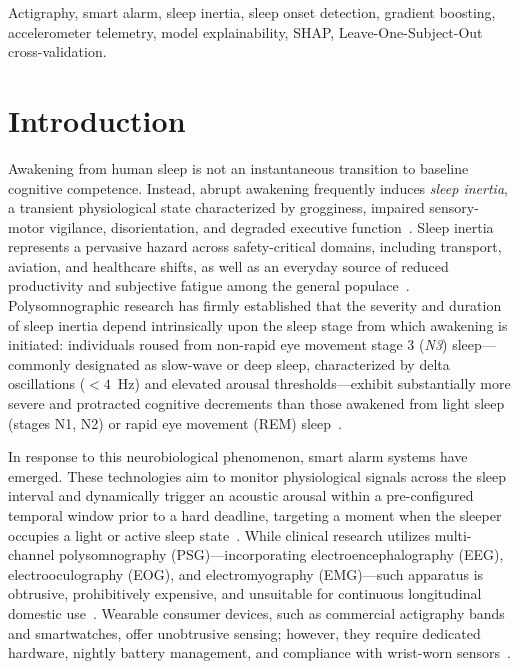 \documentclass[journal,11pt,onecolumn]{IEEEtran}
\begin{document}
\begin{IEEEkeywords}
Actigraphy, smart alarm, sleep inertia, sleep onset detection, gradient boosting, accelerometer telemetry, model explainability, SHAP, Leave-One-Subject-Out cross-validation.
\end{IEEEkeywords}

\section{Introduction}
\label{sec:introduction}\hypertarget{sec:introduction}{}

Awakening from human sleep is not an instantaneous transition to baseline cognitive competence. Instead, abrupt awakening frequently induces \textit{sleep inertia}, a transient physiological state characterized by grogginess, impaired sensory-motor vigilance, disorientation, and degraded executive function~\cite{tassi2000sleep, wertz2006effects}. Sleep inertia represents a pervasive hazard across safety-critical domains, including transport, aviation, and healthcare shifts, as well as an everyday source of reduced productivity and subjective fatigue among the general populace~\cite{ferrara2000sleep, hilditch2019sleep}. Polysomnographic research has firmly established that the severity and duration of sleep inertia depend intrinsically upon the sleep stage from which awakening is initiated: individuals roused from non-rapid eye movement stage 3 (\textit{N3}) sleep---commonly designated as slow-wave or deep sleep, characterized by delta oscillations ($<4$~Hz) and elevated arousal thresholds---exhibit substantially more severe and protracted cognitive decrements than those awakened from light sleep (stages N1, N2) or rapid eye movement (REM) sleep~\cite{trotti2017waking, kayaba2014effect}.

In response to this neurobiological phenomenon, smart alarm systems have emerged. These technologies aim to monitor physiological signals across the sleep interval and dynamically trigger an acoustic arousal within a pre-configured temporal window prior to a hard deadline, targeting a moment when the sleeper occupies a light or active sleep state~\cite{gabel2013artificial}. While clinical research utilizes multi-channel polysomnography (PSG)---incorporating electroencephalography (EEG), electrooculography (EOG), and electromyography (EMG)---such apparatus is obtrusive, prohibitively expensive, and unsuitable for continuous longitudinal domestic use~\cite{carskadon2011normal}. Wearable consumer devices, such as commercial actigraphy bands and smartwatches, offer unobtrusive sensing; however, they require dedicated hardware, nightly battery management, and compliance with wrist-worn sensors~\cite{dezambotti2019wearable, menghini2021performance}.
\end{document}
